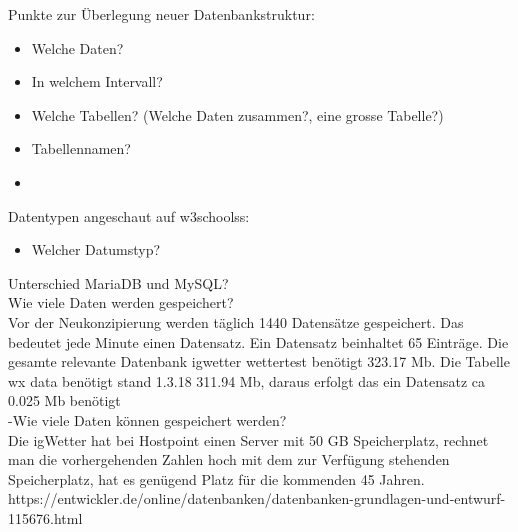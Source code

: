 Punkte zur Überlegung neuer Datenbankstruktur:
\begin{itemize}
\item Welche Daten?
\item In welchem Intervall?
\item Welche Tabellen? (Welche Daten zusammen?, eine grosse Tabelle?)
\item Tabellennamen?
\item 
\end{itemize}

Datentypen angeschaut auf w3schoolss:
\begin{itemize}
\item Welcher Datumstyp?

\end{itemize}


Unterschied MariaDB und MySQL?\\
Wie viele Daten werden gespeichert?\\
Vor der Neukonzipierung werden täglich 1440 Datensätze gespeichert. Das bedeutet jede Minute einen Datensatz. Ein Datensatz beinhaltet 65 Einträge. Die gesamte relevante Datenbank igwetter wettertest benötigt 323.17  Mb. Die Tabelle wx data benötigt stand 1.3.18 311.94 Mb, daraus erfolgt das ein Datensatz ca 0.025 Mb benötigt \\
-Wie viele Daten können gespeichert werden?\\
Die igWetter hat bei Hostpoint einen Server mit 50 GB Speicherplatz, rechnet man die vorhergehenden Zahlen hoch mit dem zur Verfügung stehenden Speicherplatz, hat es genügend Platz für die kommenden 45 Jahren.\\

https://entwickler.de/online/datenbanken/datenbanken-grundlagen-und-entwurf-115676.html
\\
\\

